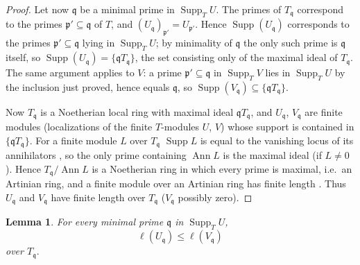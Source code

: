 \documentclass[pdflatex,sn-mathphys-num]{sn-jnl}
\numberwithin{equation}{section}
\theoremstyle{thmstyleone}
\newtheorem{lemma}[theorem]{Lemma}
\theoremstyle{thmstyletwo}
\begin{document}
\begin{proof}
Let now $\mathfrak q$ be a minimal prime in $\operatorname{Supp}_TU$. The primes of
$T_{\mathfrak q}$ correspond to the primes $\mathfrak p'\subseteq\mathfrak q$ of $T$\cite[Prop 3.11]{atiyah}, and
$(U_{\mathfrak q})_{\mathfrak p'}=U_{\mathfrak p'}$. Hence $\operatorname{Supp}(U_{\mathfrak q})$
corresponds to the primes $\mathfrak p'\subseteq\mathfrak q$ lying in $\operatorname{Supp}_TU$;
by minimality of $\mathfrak q$ the only such prime is $\mathfrak q$ itself, so
$\operatorname{Supp}(U_{\mathfrak q})=\{\mathfrak qT_{\mathfrak q}\}$, the set consisting
only of the maximal ideal of $T_{\mathfrak q}$. The same argument applies to $V$: a prime
$\mathfrak p'\subseteq\mathfrak q$ in $\operatorname{Supp}_TV$ lies in $\operatorname{Supp}_TU$
by the inclusion just proved, hence equals $\mathfrak q$, so
$\operatorname{Supp}(V_{\mathfrak q})\subseteq\{\mathfrak qT_{\mathfrak q}\}$.

Now $T_{\mathfrak q}$ is a Noetherian local ring with maximal ideal $\mathfrak qT_{\mathfrak q}$,
and $U_{\mathfrak q}$, $V_{\mathfrak q}$ are finite modules (localizations of the finite
$T$-modules $U$, $V$) whose support is contained in $\{\mathfrak qT_{\mathfrak q}\}$. For a
finite module $L$ over $T_{\mathfrak q}$ $\operatorname{Supp}L$ is equal to the vanishing locus of its annihilators \cite[Tag 00L2]{Stacks},
so the only prime containing $\operatorname{Ann}L$ is the maximal ideal (if $L\neq0$). Hence
$T_{\mathfrak q}/\operatorname{Ann}L$ is a Noetherian ring in which every prime is maximal,
i.e.\ an Artinian ring, and a finite module over an Artinian ring has finite length \cite[Thm. 8.5]{atiyah}\cite[Tag 00KH]{Stacks}. Thus
$U_{\mathfrak q}$ and $V_{\mathfrak q}$ have finite length over $T_{\mathfrak q}$
($V_{\mathfrak q}$ possibly zero).
\end{proof}


\begin{lemma}\label{lem:page-inequality}
For every minimal prime $\mathfrak q$ in $\operatorname{Supp}_T U$,
\[
 \ell(U_{\mathfrak q})
 \le \ell(V_{\mathfrak q})
\] over $T_{\mathfrak q}.$
\end{lemma}
\end{document}
